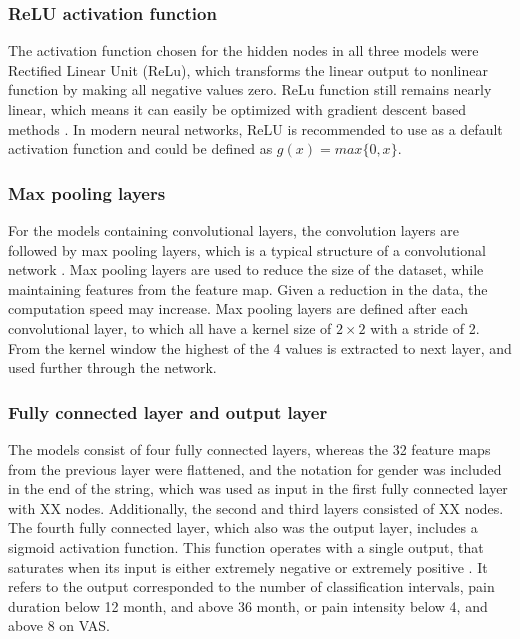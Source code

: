 \subsubsection*{\textbf{ReLU activation function}}
The activation function chosen for the hidden nodes in all three models were Rectified Linear Unit (ReLu), which transforms the linear output to nonlinear function by making all negative values zero. ReLu function still remains nearly linear, which means it can easily be optimized with gradient descent based methods \citep{Goodfellow2016}. In modern neural networks, ReLU is recommended to use as a default activation function and could be defined as $g(x) = max\{0, x\}$. 


\subsubsection*{\textbf{Max pooling layers}}
For the models containing convolutional layers, the convolution layers are followed by max pooling layers, which is a typical structure of a convolutional network \citep{LeCun2015, Goodfellow2016}.
Max pooling layers are used to reduce the size of the dataset, while maintaining features from the feature map. Given a reduction in the data, the computation speed may increase.\citep{Goodfellow2016,LeCun1998} 
Max pooling layers are defined after each convolutional layer, to which all have a kernel size of $2 \times 2$ with a stride of 2. From the kernel window the highest of the 4 values is extracted to next layer, and used further through the network. 

\subsubsection{\textbf{Fully connected layer and output layer}}
The models consist of four fully connected layers, whereas the 32 feature maps from the previous layer were flattened, and the notation for gender was included in the end of the string, which was used as input in the first fully connected layer with XX nodes. Additionally, the second and third layers consisted of XX nodes. The fourth fully connected layer, which also was the output layer, includes a sigmoid activation function. 
This function operates with a single output, that saturates when its input is either extremely negative or extremely positive \citep{Goodfellow2016}. It refers to the output corresponded to the number of classification intervals, pain duration below 12 month, and above 36 month, or pain intensity below 4, and above 8 on VAS. 


